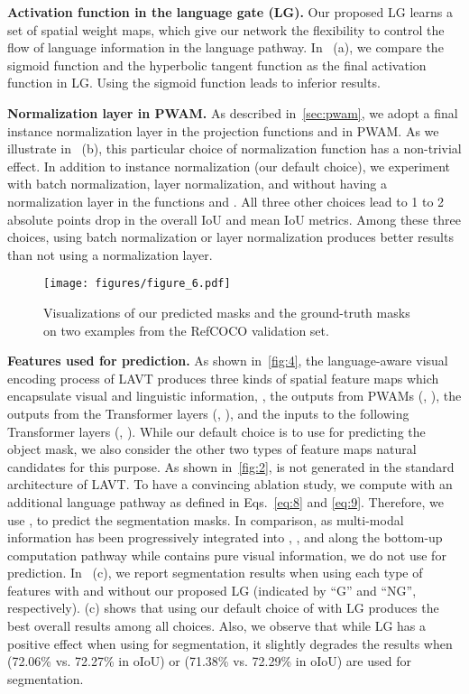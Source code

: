 \documentclass[10pt,twocolumn,letterpaper]{article}
\begin{document}
\noindent \textbf{Activation function in the language gate (LG).}
Our proposed LG learns a set of spatial weight maps, which give our network the flexibility to control the flow of language information in the language pathway.
In~ (a), we compare the sigmoid function and the hyperbolic tangent function as the final activation function in LG.
Using the sigmoid function leads to inferior results.

\noindent \textbf{Normalization layer in PWAM.}
As described in~\cref{sec:pwam}, we adopt a final instance normalization layer in the projection functions  and  in PWAM.
As we illustrate in~ (b), this particular choice of normalization function has a non-trivial effect.
In addition to instance normalization (our default choice), we experiment with batch normalization, layer normalization, and without having a normalization layer in the functions  and .
All three other choices lead to 1 to 2 absolute points drop in the overall IoU and mean IoU metrics.
Among these three choices, using batch normalization or layer normalization produces better results than not using a normalization layer.


\begin{figure*}[th!]
\centering
\texttt{[image: figures/figure\_6.pdf]}
\caption{Visualizations of our predicted masks and the ground-truth masks on two examples from the RefCOCO validation set.}
\vspace{-0.2cm}
\label{fig:6}
\end{figure*}


\noindent \textbf{Features used for prediction.}
As shown in~\cref{fig:4}, the language-aware visual encoding process of LAVT produces three kinds of spatial feature maps which encapsulate visual and linguistic information, \ie, the outputs from PWAMs (, ), the outputs from the Transformer layers (, ), and the inputs to the following Transformer layers (, ).
While our default choice is to use  for predicting the object mask, we also consider the other two types of feature maps natural candidates for this purpose.
As shown in~\cref{fig:2},  is not generated in the standard architecture of LAVT.
To have a convincing ablation study, we compute  with an additional language pathway as defined in Eqs.~\ref{eq:8} and \ref{eq:9}.
Therefore, we use ,  to predict the segmentation masks.
In comparison, as multi-modal information has been progressively integrated into , , and  along the bottom-up computation pathway while  contains pure visual information, we do not use  for prediction.
In~ (c), we report segmentation results when using each type of features with and without our proposed LG (indicated by ``G'' and ``NG'', respectively).
 (c) shows that using our default choice of  with LG produces the best overall results among all choices.
Also, we observe that while LG has a positive effect when using  for segmentation, it slightly degrades the results when  (72.06\% vs. 72.27\% in oIoU) or  (71.38\% vs. 72.29\% in oIoU) are used for segmentation.
\end{document}
